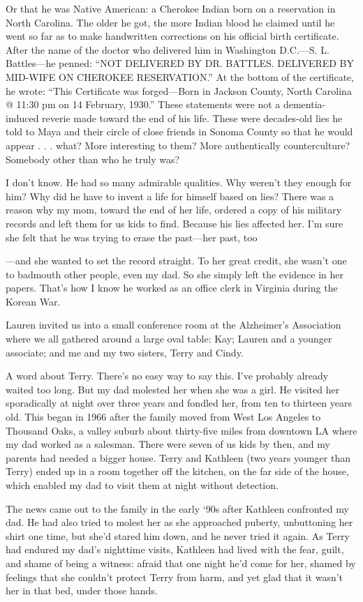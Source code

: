 \documentclass[12pt]{book}
\begin{document}
Or that he was Native American: a Cherokee Indian born on a reservation in North Carolina. The older he got, the more Indian blood he claimed until he went so far as to make handwritten corrections on his official birth certificate. After the name of the doctor who delivered him in Washington D.C.---S. L. Battles---he penned: ``NOT DELIVERED BY DR. BATTLES. DELIVERED BY MID-WIFE ON CHEROKEE RESERVATION.'' At the bottom of the certificate, he wrote: ``This Certificate was forged---Born in Jackson County, North Carolina @ 11:30 pm on 14 February, 1930.'' These statements were not a dementia-induced reverie made toward the end of his life. These were decades-old lies he told to Maya and their circle of close friends in Sonoma County so that he would appear . . . what? More interesting to them? More authentically counterculture? Somebody other than who he truly was?

I don't know. He had so many admirable qualities. Why weren't they enough for him? Why did he have to invent a life for himself based on lies? There was a reason why my mom, toward the end of her life, ordered a copy of his military records and left them for us kids to find. Because his lies affected her. I'm sure she felt that he was trying to erase the past---her past, too

---and she wanted to set the record straight. To her great credit, she wasn't one to badmouth other people, even my dad. So she simply left the evidence in her papers. That's how I know he worked as an office clerk in Virginia during the Korean War.

Lauren invited us into a small conference room at the Alzheimer's Association where we all gathered around a large oval table: Kay; Lauren and a younger associate; and me and my two sisters, Terry and Cindy.

A word about Terry. There's no easy way to say this. I've probably already waited too long. But my dad molested her when she was a girl. He visited her sporadically at night over three years and fondled her, from ten to thirteen years old. This began in 1966 after the family moved from West Los Angeles to Thousand Oaks, a valley suburb about thirty-five miles from downtown LA where my dad worked as a salesman. There were seven of us kids by then, and my parents had needed a bigger house. Terry and Kathleen (two years younger than Terry) ended up in a room together off the kitchen, on the far side of the house, which enabled my dad to visit them at night without detection.

The news came out to the family in the early `90s after Kathleen confronted my dad. He had also tried to molest her as she approached puberty, unbuttoning her shirt one time, but she'd stared him down, and he never tried it again. As Terry had endured my dad's nighttime visits, Kathleen had lived with the fear, guilt, and shame of being a witness: afraid that one night he'd come for her, shamed by feelings that she couldn't protect Terry from harm, and yet glad that it wasn't her in that bed, under those hands.
\end{document}
